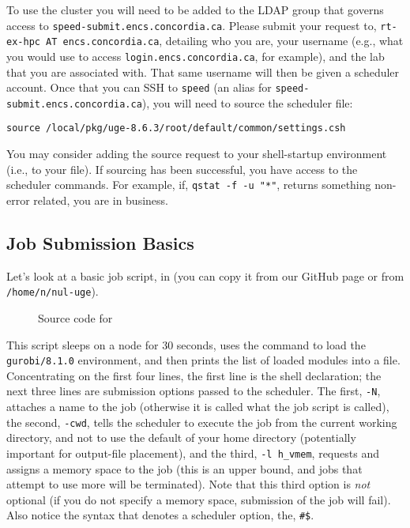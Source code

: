 \documentclass{easychair}
\begin{document}
To use the cluster you will need to be added to the LDAP group that governs access to \texttt{speed-submit.encs.concordia.ca}. Please submit your request to, 
\texttt{rt-ex-hpc AT encs.concordia.ca}, detailing who you are, your username (e.g., what you would use to access \texttt{login.encs.concordia.ca}, for example), and the lab that you are associated with. That same username will then be given a scheduler account. Once that you can SSH to \texttt{speed} (an alias for \texttt{speed-submit.encs.concordia.ca}), you will
need to source the scheduler file:

\begin{verbatim}
source /local/pkg/uge-8.6.3/root/default/common/settings.csh 
\end{verbatim}

You may consider adding the source request to your shell-startup environment (i.e., to your  file). If sourcing has been successful, you have access to the scheduler commands. For example, if, \texttt{qstat -f -u "*"}, returns something non-error related, you are in business. 

\subsection{Job Submission Basics}

Let's look at a basic job script,  in 
(you can copy it from our GitHub page or from \texttt{/home/n/nul-uge}).

\begin{figure}[htpb]
    
    \caption{Source code for }
	\label{fig:tcsh.sh}
\end{figure}

This script sleeps on a node for 30 seconds, uses the  command to load the \texttt{gurobi/8.1.0} environment, and then prints the list of loaded modules into a file. Concentrating on the first four lines, the first line is the shell declaration; the next three lines are submission options passed to the scheduler. The first, \texttt{-N}, attaches a name to the job (otherwise it is called what the job script is called), the second, \texttt{-cwd}, tells the scheduler to execute the job from the current working directory, and not to use the default of your home directory (potentially important for output-file placement), and the third, \texttt{-l h\_vmem}, requests and assigns a memory space to the job (this is an upper bound, and jobs that attempt to use more will be terminated). Note that this third option 
is \emph{not} optional (if you do not specify a memory space, submission of the job will fail). Also notice the syntax that denotes a scheduler option, the, \verb+#$+. 
\end{document}
